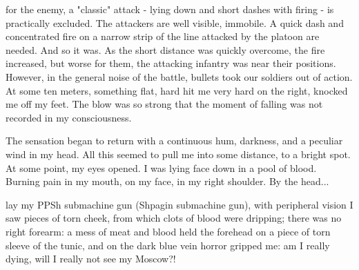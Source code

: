 \label{9-1}
for the enemy, a "classic" attack - lying down and short dashes with firing - is practically excluded. The attackers are well visible, immobile. A quick dash and concentrated fire on a narrow strip of the line attacked by the platoon are needed. And so it was. As the short distance was quickly overcome, the fire increased, but worse for them, the attacking infantry was near their positions. However, in the general noise of the battle, bullets took our soldiers out of action. At some ten meters, something flat, hard hit me very hard on the right, knocked me off my feet. The blow was so strong that the moment of falling was not recorded in my consciousness.

\label{9-2}
The sensation began to return with a continuous hum, darkness, and a peculiar wind in my head. All this seemed to pull me into some distance, to a bright spot. At some point, my eyes opened. I was lying face down in a pool of blood. Burning pain in my mouth, on my face, in my right shoulder. By the head...

\label{10-1}
lay my PPSh submachine gun (Shpagin submachine gun), with peripheral vision I saw pieces of torn cheek, from which clots of blood were dripping; there was no right forearm: a mess of meat and blood held the forehead on a piece of torn sleeve of the tunic, and on the dark blue vein horror gripped me: am I really dying, will I really not see my Moscow?!
